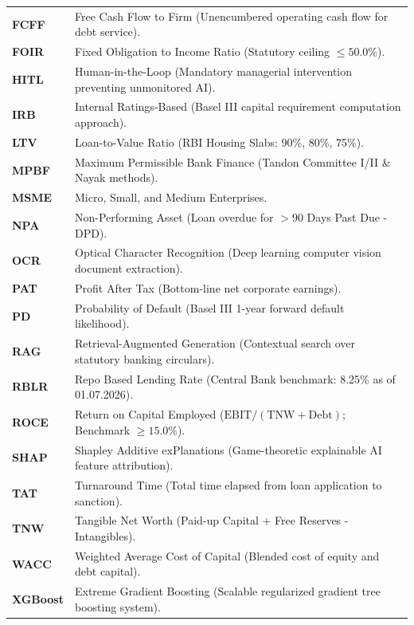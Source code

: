 \documentclass[11pt,a4paper,oneside]{report}
\begin{document}
\begin{longtable}{p{} p{}}
\textbf{FCFF} & Free Cash Flow to Firm (Unencumbered operating cash flow for debt service). \\
\textbf{FOIR} & Fixed Obligation to Income Ratio (Statutory ceiling $\le 50.0\%$). \\
\textbf{HITL} & Human-in-the-Loop (Mandatory managerial intervention preventing unmonitored AI). \\
\textbf{IRB} & Internal Ratings-Based (Basel III capital requirement computation approach). \\
\textbf{LTV} & Loan-to-Value Ratio (RBI Housing Slabs: 90\%, 80\%, 75\%). \\
\textbf{MPBF} & Maximum Permissible Bank Finance (Tandon Committee I/II \& Nayak methods). \\
\textbf{MSME} & Micro, Small, and Medium Enterprises. \\
\textbf{NPA} & Non-Performing Asset (Loan overdue for $> 90$ Days Past Due - DPD). \\
\textbf{OCR} & Optical Character Recognition (Deep learning computer vision document extraction). \\
\textbf{PAT} & Profit After Tax (Bottom-line net corporate earnings). \\
\textbf{PD} & Probability of Default (Basel III 1-year forward default likelihood). \\
\textbf{RAG} & Retrieval-Augmented Generation (Contextual search over statutory banking circulars). \\
\textbf{RBLR} & Repo Based Lending Rate (Central Bank benchmark: 8.25\% as of 01.07.2026). \\
\textbf{ROCE} & Return on Capital Employed ($\text{EBIT} / (\text{TNW} + \text{Debt})$; Benchmark $\ge 15.0\%$). \\
\textbf{SHAP} & Shapley Additive exPlanations (Game-theoretic explainable AI feature attribution). \\
\textbf{TAT} & Turnaround Time (Total time elapsed from loan application to sanction). \\
\textbf{TNW} & Tangible Net Worth (Paid-up Capital + Free Reserves - Intangibles). \\
\textbf{WACC} & Weighted Average Cost of Capital (Blended cost of equity and debt capital). \\
\textbf{XGBoost} & Extreme Gradient Boosting (Scalable regularized gradient tree boosting system). \\
\bottomrule
\end{longtable}
\end{document}
